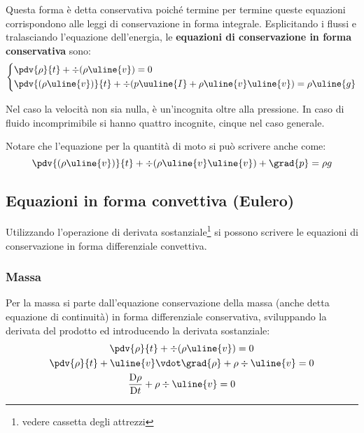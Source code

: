 Questa forma è detta conservativa poiché termine per termine queste equazioni corrispondono alle leggi di conservazione in forma integrale.
Esplicitando i flussi e tralasciando l'equazione dell'energia, le \textbf{equazioni di conservazione in forma conservativa} sono:
%
	\begin{equation*}
		\left\{
		\begin{aligned}
			&\pdv{\rho}{t} + \div{(\rho \uline{v})} = 0\\
			&\pdv{(\rho \uline{v})}{t} + \div{(p \uuline{I} + \rho \uline{v} \uline{v})} = \rho \uline{g}
		\end{aligned}
		\right.
	\end{equation*}
%
	
Nel caso la velocità non sia nulla, è un'incognita oltre alla pressione.
In caso di fluido incomprimibile si hanno quattro incognite, cinque nel caso generale.

Notare che l'equazione per la quantità di moto si può scrivere anche come:
	\begin{equation*}
		\pdv{(\rho \uline{v})}{t} + \div{(\rho \uline{v} \uline{v})} + \grad{p} = \rho g
	\end{equation*}
	
\subsection{Equazioni in forma convettiva (Eulero)}
Utilizzando l'operazione di derivata sostanziale\footnote{vedere cassetta degli attrezzi} si possono scrivere le equazioni di conservazione in forma differenziale convettiva.

\subsubsection{Massa}
Per la massa si parte dall'equazione conservazione della massa (anche detta equazione di continuità) in forma differenziale conservativa, sviluppando la derivata del prodotto ed introducendo la derivata sostanziale:
%
	\begin{equation*}
		\begin{gathered}
			\pdv{\rho}{t} + \div{(\rho \uline{v})} = 0\\
			\pdv{\rho}{t} + \uline{v} \vdot \grad{\rho} + \rho \div{\uline{v}} = 0\\
			\frac{\mathrm{D} \rho}{\mathrm{D} t} + \rho \div{\uline{v}} = 0
		\end{gathered}
	\end{equation*}
%

